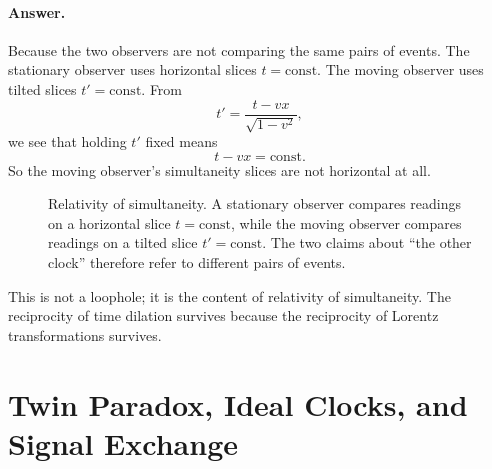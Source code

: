 \paragraph{Answer.} Because the two observers are not comparing the same pairs of events. The stationary observer uses horizontal slices \(t=\mathrm{const}\). The moving observer uses tilted slices \(t'=\mathrm{const}\). From
\begin{equation}
t'=\frac{t-vx}{\sqrt{1-v^2}},
\end{equation}
we see that holding \(t'\) fixed means
\begin{equation}
t-vx=\mathrm{const}.
\end{equation}
So the moving observer's simultaneity slices are not horizontal at all.

\begin{figure}[h]
\centering
{}
\caption{Relativity of simultaneity. A stationary observer compares readings on a horizontal slice \(t=\mathrm{const}\), while the moving observer compares readings on a tilted slice \(t'=\mathrm{const}\). The two claims about ``the other clock'' therefore refer to different pairs of events.}
\end{figure}

This is not a loophole; it is the content of relativity of simultaneity. The reciprocity of time dilation survives because the reciprocity of Lorentz transformations survives.

\section{Twin Paradox, Ideal Clocks, and Signal Exchange}

